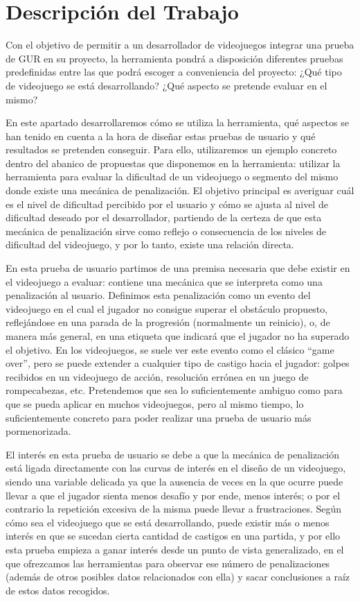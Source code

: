 \chapter{Descripción del Trabajo}
\label{cap:descripcionTrabajo}
Con el objetivo de permitir a un desarrollador de videojuegos integrar una prueba de GUR en su proyecto, la herramienta pondrá a disposición diferentes pruebas predefinidas entre las que podrá escoger a conveniencia del proyecto:  ¿Qué tipo de videojuego se está desarrollando? ¿Qué aspecto se pretende evaluar en el mismo? 


En este apartado desarrollaremos cómo se utiliza la herramienta, qué aspectos se han tenido en cuenta a la hora de diseñar estas pruebas de usuario y qué resultados se pretenden conseguir. Para ello, utilizaremos un ejemplo concreto dentro del abanico de propuestas que disponemos en la herramienta: utilizar la herramienta para evaluar la dificultad de un videojuego o segmento del mismo donde existe una mecánica de penalización. El objetivo principal es averiguar cuál es el nivel de dificultad percibido por el usuario y cómo se ajusta al nivel de dificultad deseado por el desarrollador, partiendo de la certeza de que esta mecánica de penalización sirve como reflejo o consecuencia de los niveles de dificultad del videojuego, y por lo tanto, existe una relación directa.


En esta prueba de usuario partimos de una premisa necesaria que debe existir en el videojuego a evaluar: contiene una mecánica que se interpreta como una penalización al usuario. Definimos esta penalización como un evento del videojuego en el cual el jugador no consigue superar el obstáculo propuesto, reflejándose en una parada de la progresión (normalmente un reinicio), o, de manera más general, en una etiqueta que indicará que el jugador no ha superado el objetivo. En los videojuegos, se suele ver este evento como el clásico “game over”, pero se puede extender a cualquier tipo de castigo hacia el jugador: golpes recibidos en un videojuego de acción, resolución errónea en un juego de rompecabezas, etc. Pretendemos que sea lo suficientemente ambiguo como para que se pueda aplicar en muchos videojuegos, pero al mismo tiempo, lo suficientemente concreto para poder realizar una prueba de usuario más pormenorizada. 


El interés en esta prueba de usuario se debe a que la mecánica de penalización está ligada directamente con las curvas de interés en el diseño de un videojuego, siendo una variable delicada ya que la ausencia de veces en la que ocurre puede llevar a que el jugador sienta menos desafío y por ende, menos interés; o por el contrario la repetición excesiva de la misma puede llevar a frustraciones. Según cómo sea el videojuego que se está desarrollando, puede existir más o menos interés en que se sucedan cierta cantidad de castigos en una partida, y por ello esta prueba empieza a ganar interés desde un punto de vista generalizado, en el que ofrezcamos las herramientas para observar ese número de penalizaciones (además de otros posibles datos relacionados con ella) y sacar conclusiones a raíz de estos datos recogidos. 


